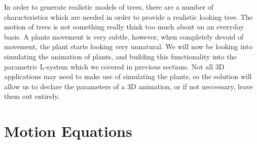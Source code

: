 
\begin{flushleft}

In order to generate realistic models of trees, there are a number of characteristics which are needed in order to provide a realistic looking tree. The motion of trees is not something really think too much about on an everyday basis. A plants movement is very subtle, however, when completely devoid of movement, the plant starts looking very unnatural. We will now be looking into simulating the animation of plants, and building this functionality into the parametric L-system which we covered in previous sections. Not all 3D applications may need to make use of simulating the plants, so the solution will allow us to declare the parameters of a 3D animation, or if not neccessary, leave them out entirely.\\

\vspace{5mm}

\cite{barron2001real}

\end{flushleft}

\section{Motion Equations}

